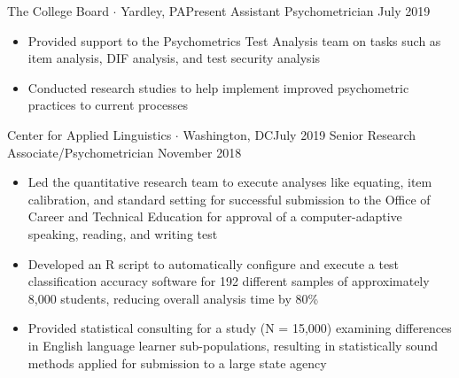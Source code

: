 %
%
%
\begin{experiences}
 \experience
    {The College Board $\cdot$ Yardley, PA}{Present }
    {Assistant Psychometrician}
    {July 2019 }    {
       \begin{itemize}
             \item Provided support to the Psychometrics Test Analysis team on tasks such as item analysis, DIF analysis, and test security analysis
             \item Conducted research studies to help implement improved psychometric practices to current processes
       \end{itemize}
                    }

  \emptySeparator  


	\experience
    {Center for Applied Linguistics $\cdot$ Washington, DC}{July 2019}
    {Senior Research Associate/Psychometrician}
    {November 2018} {
      \begin{itemize}

            \item Led the quantitative research team to execute analyses like equating, item calibration, and standard setting for successful submission to the Office of Career and Technical Education for approval of a computer-adaptive speaking, reading, and writing test
      
            \item Developed an R script to automatically configure and execute a test classification accuracy software for 192 different samples of approximately 8,000 students, reducing overall analysis time by 80\%
            
            \item Provided statistical consulting for a study (N = 15,000) examining differences in English language learner sub-populations, resulting in statistically sound methods applied for submission to a large state agency
      

\end{itemize}}
\end{experiences}
